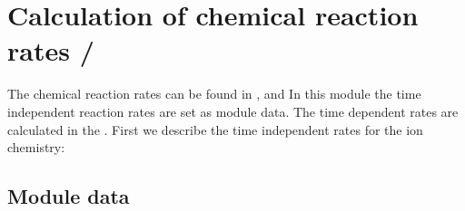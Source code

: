 %
\section{Calculation of chemical reaction rates / }\label{cap:chemrates}
%
The chemical reaction rates can be found in \cite{roble1995}, and
\cite{roble1987}
%
In this module the time independent reaction rates are set as module
data. The time dependent rates are calculated in the . First we describe the time independent rates for
the ion chemistry:
%
\subsection{Module data}\label{cap:subsec_module_rates}

